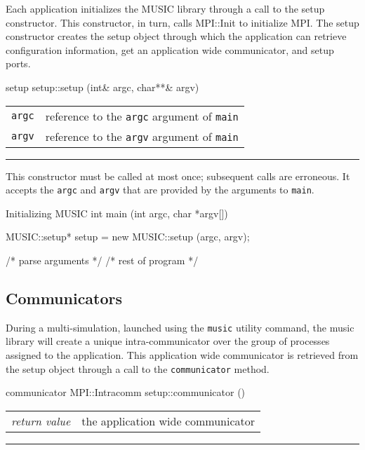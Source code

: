 \documentclass[a4paper]{report}
\makeatletter
\newenvironment{parameters}%
{\begin{tabular}{@{\hspace{2em}}lp{0.6\textwidth}}}%
{\end{tabular}\par\vspace{1mm}\par\hrule\par\vspace{5mm}}
\makeatother
\begin{document}
Each application initializes the MUSIC library through a call to the
setup constructor.  This constructor, in turn, calls
MPI::Init to initialize
MPI.  The setup constructor creates the setup
object through which the application can retrieve configuration
information, get an application wide communicator, and setup ports.

\begin{head}{setup}
  setup::setup (int& argc, char**& argv)
\end{head}
\begin{parameters}
  \lstinline|argc| &%
  reference to the \lstinline|argc| argument of \lstinline|main| \\
  \lstinline|argv| &%
  reference to the \lstinline|argv| argument of \lstinline|main| \\
\end{parameters}

This constructor must be called at most once; subsequent calls are
erroneous.  It accepts the \lstinline|argc| and \lstinline|argv| that are
provided by the arguments to \lstinline|main|.

\begin{code}{Initializing MUSIC}
int main (int argc, char *argv[])
{
  MUSIC::setup* setup = new MUSIC::setup (argc, argv);

  /* parse arguments */
  /* rest of program */
}
\end{code}

\subsection{Communicators}

During a multi-simulation, launched using the \lstinline|music|
utility command, the music library will create a unique
intra-communicator over the group of processes assigned to the
application.  This application wide communicator is retrieved from the
setup object through a call to the
\lstinline|communicator| method.

\begin{head}{communicator}
  MPI::Intracomm setup::communicator ()
\end{head}
\begin{parameters}
  \emph{return value} & the application wide communicator \\
\end{parameters}
\end{document}
